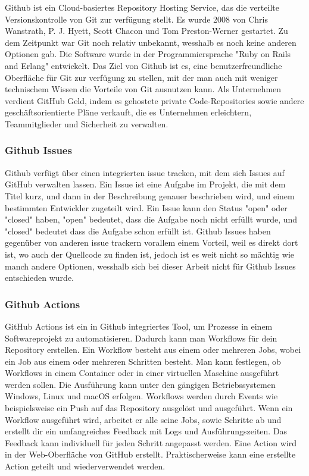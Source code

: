 Github ist ein Cloud-basiertes Repository Hosting Service, das die verteilte Versionskontrolle von Git zur verfügung stellt. Es wurde 2008 von Chris Wanstrath, P. J. Hyett, 
Scott Chacon und Tom Preston-Werner gestartet. Zu dem Zeitpunkt war Git noch relativ unbekannt, wesshalb es noch keine anderen Optionen gab. Die Software wurde in der 
Programmiersprache "Ruby on Rails and Erlang" entwickelt. 
\cite{sysarch-github-1}
Das Ziel von Github ist es, eine benutzerfreundliche Oberfläche für Git zur verfügung zu stellen, mit der man auch mit weniger technischem Wissen die Vorteile von Git ausnutzen kann.
\cite{sysarch-github-2}
Als Unternehmen verdient GitHub Geld, indem es gehostete private Code-Repositories sowie andere geschäftsorientierte Pläne verkauft, 
die es Unternehmen erleichtern, Teammitglieder und Sicherheit zu verwalten.
\cite{sysarch-github-2}

\subsubsection{Github Issues}

Github verfügt über einen integrierten issue tracken, mit dem sich Issues auf GitHub verwalten lassen. Ein Issue ist eine 
Aufgabe im Projekt, die mit dem Titel kurz, und dann in der Beschreibung genauer beschrieben wird, und einem bestimmten Entwickler 
zugeteilt wird. Ein Issue kann den Status "open" oder "closed" haben, "open" bedeutet, dass die Aufgabe noch nicht erfüllt wurde, und 
"closed" bedeutet dass die Aufgabe schon erfüllt ist. Github Issues haben gegenüber von anderen issue trackern vorallem einem Vorteil, 
weil es direkt dort ist, wo auch der Quellcode zu finden ist, jedoch ist es weit nicht so mächtig wie manch andere Optionen, wesshalb 
sich bei dieser Arbeit nicht für Github Issues entschieden wurde.
\cite{sysarch-github-3}

\subsubsection{Github Actions}

GitHub Actions ist ein in Github integriertes Tool, um Prozesse in einem Softwareprojekt zu automatisieren. 
Dadurch kann man Workflows für dein Repository erstellen. Ein Workflow besteht aus einem oder mehreren Jobs, 
wobei ein Job aus einem oder mehreren Schritten besteht. Man kann festlegen, ob Workflows in einem Container oder in einer virtuellen 
Maschine ausgeführt werden sollen. Die Ausführung kann unter den gängigen Betriebssystemen Windows, Linux und macOS erfolgen. 
Workflows werden durch Events wie beispielsweise ein Push auf das Repository ausgelöst und ausgeführt. Wenn ein Workflow ausgeführt wird, 
arbeitet er alle seine Jobs, sowie Schritte ab und erstellt dir ein umfangreiches Feedback mit Logs und Ausführungszeiten. 
Das Feedback kann individuell für jeden Schritt angepasst werden. Eine Action wird in der Web-Oberfläche von GitHub erstellt. 
Praktischerweise kann eine erstellte Action geteilt und wiederverwendet werden.
\cite{sysarch-github-4}


